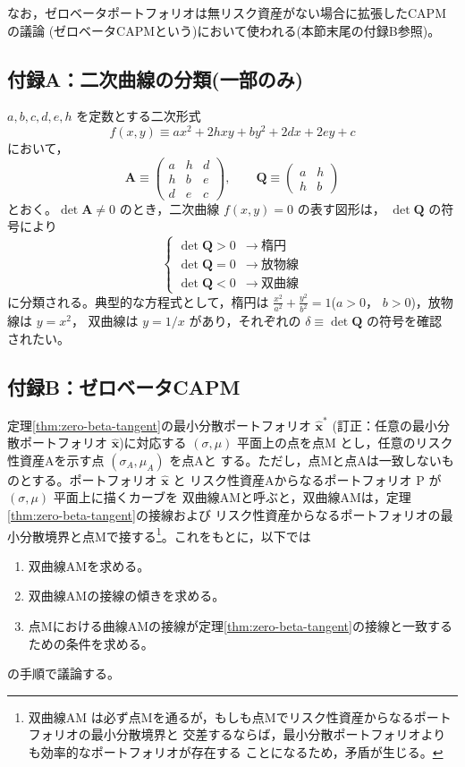なお，ゼロベータポートフォリオは無リスク資産がない場合に拡張したCAPMの議論
(ゼロベータCAPMという)において使われる(本節末尾の付録B参照)。

\subsection*{付録A：二次曲線の分類(一部のみ)}

$a,b,c,d,e,h$ を定数とする二次形式
\begin{equation}
f(x,y) \equiv ax^2 + 2hxy + by^2 + 2dx + 2ey + c
\end{equation}
において，
\begin{equation}
\bm{A} \equiv \begin{pmatrix} a & h & d\\ h & b & e\\ d & e & c\end{pmatrix},
\qquad
\bm{Q} \equiv \begin{pmatrix} a & h\\ h & b\end{pmatrix}
\end{equation}
とおく。$\det\bm{A} \neq 0$ のとき，二次曲線 $f(x,y)=0$ の表す図形は，
$\det\bm{Q}$ の符号により
\begin{equation}
\begin{cases}
\det\bm{Q} > 0 & \longrightarrow\ \text{楕円}\\
\det\bm{Q} = 0 & \longrightarrow\ \text{放物線}\\
\det\bm{Q} < 0 & \longrightarrow\ \text{双曲線}
\end{cases}
\end{equation}
に分類される。典型的な方程式として，楕円は
$\frac{x^2}{a^2}+\frac{y^2}{b^2}=1$($a>0$， $b>0$)，放物線は $y=x^2$，
双曲線は $y = 1/x$ があり，それぞれの $\delta \equiv \det\bm{Q}$ の符号を確認
されたい。

\subsection*{付録B：ゼロベータCAPM}

定理\ref{thm:zero-beta-tangent}の最小分散ポートフォリオ $\hat{\bm{x}}^*$
(訂正：任意の最小分散ポートフォリオ $\hat{\bm{x}}$)に対応する $(\sigma,\mu)$
平面上の点を点M とし，任意のリスク性資産Aを示す点 $(\sigma_A,\mu_A)$ を点Aと
する。ただし，点Mと点Aは一致しないものとする。ポートフォリオ $\hat{\bm{x}}$ と
リスク性資産Aからなるポートフォリオ P が $(\sigma,\mu)$ 平面上に描くカーブを
双曲線AMと呼ぶと，双曲線AMは，定理\ref{thm:zero-beta-tangent}の接線および
リスク性資産からなるポートフォリオの最小分散境界と点Mで接する\footnote{双曲線AM
は必ず点Mを通るが，もしも点Mでリスク性資産からなるポートフォリオの最小分散境界と
交差するならば，最小分散ポートフォリオよりも効率的なポートフォリオが存在する
ことになるため，矛盾が生じる。}。これをもとに，以下では
\begin{enumerate}
\item 双曲線AMを求める。
\item 双曲線AMの接線の傾きを求める。
\item 点Mにおける曲線AMの接線が定理\ref{thm:zero-beta-tangent}の接線と一致する
ための条件を求める。
\end{enumerate}
の手順で議論する。

